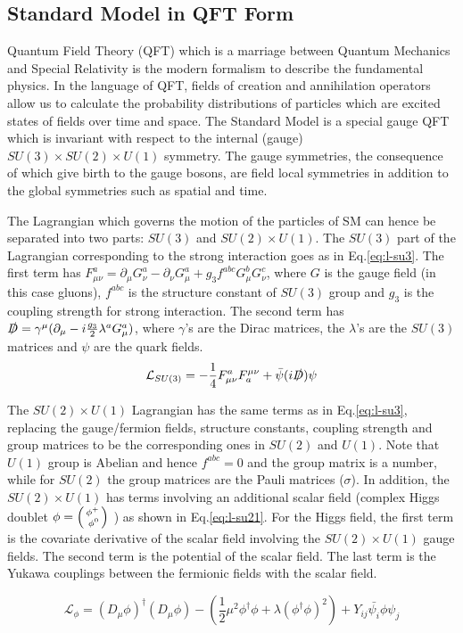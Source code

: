 \subsection{Standard Model in QFT Form}

Quantum Field Theory (QFT) which is a marriage between Quantum Mechanics and Special Relativity is the modern formalism to describe the fundamental physics. In the language of QFT, fields of creation and annihilation operators allow us to calculate the probability distributions of particles which are excited states of fields over time and space. The Standard Model is a special gauge QFT which is invariant with respect to the internal (gauge) $SU(3)\times SU(2)\times U(1)$ symmetry. The gauge symmetries, the consequence of which give birth to the gauge bosons, are field local symmetries in addition to the global symmetries such as spatial and time. 

The Lagrangian which governs the motion of the particles of SM can hence be separated into two parts: $SU(3)$ and $SU(2)\times U(1)$. The $SU(3)$ part of the Lagrangian corresponding to the strong interaction goes as in Eq.\ref{eq:l-su3}. The first term has $F^{a}_{\mu\nu}  = \partial_{\mu}G^a_{\nu}-\partial_{\nu}G^a_{\mu}+g_3f^{abc}G^b_{\mu}G^c_{\nu}$, where $G$ is the gauge field (in this case gluons), $f^{abc}$ is the structure constant of $SU(3)$ group and $g_3$ is the coupling strength for strong interaction. The second term has $\slashed{D} = \gamma^{\mu}(\partial_{\mu}- i\frac{g_3}{2}\lambda^aG^a_{\mu})$, where $\gamma$'s are the Dirac matrices, the $\lambda$'s are the $SU(3)$ matrices and $\psi$ are the quark fields. 
\begin{equation}
  \mathcal{L}_{SU(3)} = -\frac{1}{4}F^{a}_{\mu\nu}F_{a}^{\mu\nu}+ \bar{\psi}(i\slashed{D}) \psi
  \label{eq:l-su3}
\end{equation}

The $SU(2)\times U(1)$ Lagrangian has the same terms as in Eq.\ref{eq:l-su3}, replacing the gauge/fermion fields, structure constants, coupling strength and group matrices to be the corresponding ones in $SU(2)$ and $U(1)$. Note that $U(1)$ group is Abelian and hence $f^{abc}=0$ and the group matrix is a number, while for $SU(2)$ the group matrices are the Pauli matrices ($\sigma$). In addition, the $SU(2)\times U(1)$ has terms involving an additional scalar field (complex Higgs doublet $\phi = \begin{psmallmatrix*}[r] \phi^+ \\ \phi^0 \end{psmallmatrix*} $ ) as shown in Eq.\ref{eq:l-su21}. For the Higgs field, the first term is the covariate derivative of the scalar field involving the $SU(2)\times U(1)$ gauge fields. The second term is the potential of the scalar field. The last term is the Yukawa couplings between the fermionic fields with the scalar field. 

\begin{equation}
  \mathcal{L}_{\phi} = (D_{\mu}\phi)^{\dagger}(D_{\mu}\phi)-(\frac{1}{2}\mu^2\phi^{\dagger}\phi+\lambda(\phi^{\dagger}\phi )^2)+Y_{ij}\bar{\psi_i}\phi\psi_j
  \label{eq:l-su21}
\end{equation}


